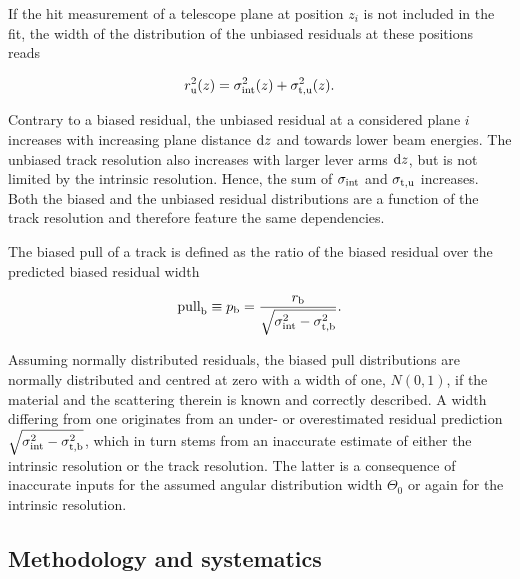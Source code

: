 If the hit measurement of a telescope plane at position $z_i$ is not included in the fit,
 the width of the distribution of the \textrm{unbiased} residuals at these positions reads~\cite{ref:eudetreport200902}
 
\begin{equation}
r_{\textrm{u}}^2(z) = \sigma_{\textrm{int}}^2(z) + \sigma_{\textrm{t,u}}^2(z).
\label{eq:telescoperesolutionequation2} 
\end{equation}

\noindent
Contrary to a biased residual, the unbiased residual at a considered plane $i$ increases with increasing plane distance $\textrm{d}z$ and towards lower beam energies. 
The unbiased track resolution also increases with larger lever arms $\textrm{d}z$, but is not limited by the intrinsic resolution. 
Hence, the sum of $\sigma_{\textrm{int}}$ and $\sigma_{\textrm{t,u}}$ increases. 
Both the biased and the unbiased residual distributions are a function of the track resolution and therefore feature the same dependencies.

The biased pull of a track is defined as the ratio of the biased residual over the predicted biased residual width

\begin{equation}
 \textrm{pull}_{\textrm{b}} \equiv p_{\textrm{b}} = \frac{r_{\textrm{b}}}{\sqrt{\sigma_{\textrm{int}}^2 - \sigma_{\textrm{t,b}}^2}}.
 \label{eq:pull}
\end{equation}

\noindent
Assuming normally distributed residuals, the biased pull distributions are normally distributed and centred at zero with a width of one, $N(0,1)$,
 if the material and the scattering therein is known and correctly described. 
A width differing from one originates from an under- or overestimated residual prediction $\sqrt{\sigma_{\textrm{int}}^2 - \sigma_{\textrm{t,b}}^2}$, which in turn stems from an inaccurate estimate of either the intrinsic resolution
 or the track resolution. 
The latter is a consequence of inaccurate inputs for the assumed angular distribution width $\Theta_0$ or again for the intrinsic resolution. 


\subsection{Methodology and systematics}
\label{sec:meth}

